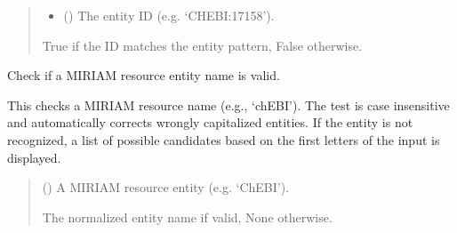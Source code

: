 \documentclass[letterpaper,12pt,english]{sphinxmanual}
\begin{document}
\begin{fulllineitems}
\begin{fulllineitems}
\begin{quote}
\begin{description}
\begin{itemize}
\item {} 
\sphinxAtStartPar
{} () \textendash{} The entity ID (e.g. ‘CHEBI:17158’).

\end{itemize}

\sphinxAtStartPar
{} \textendash{} True if the ID matches the entity pattern, False otherwise.

\end{description}\end{quote}

\end{fulllineitems}


\begin{fulllineitems}
\label{\detokenize{api/core:cbmpy.CBCommon.MIRIAMannotation.checkEntity}}
\pysigstartsignatures
\pysiglinewithargsret
{}
{}
{}
\pysigstopsignatures
\sphinxAtStartPar
Check if a MIRIAM resource entity name is valid.

\sphinxAtStartPar
This checks a MIRIAM resource name (e.g., ‘chEBI’). The test is case
insensitive and automatically corrects wrongly capitalized entities. If
the entity is not recognized, a list of possible candidates based on
the first letters of the input is displayed.
\begin{quote}\begin{description}
\sphinxAtStartPar
{} () \textendash{} A MIRIAM resource entity (e.g. ‘ChEBI’).

\sphinxAtStartPar
{} \textendash{} The normalized entity name if valid, None otherwise.

\end{description}\end{quote}

\end{fulllineitems}



\end{fulllineitems}
\end{document}

